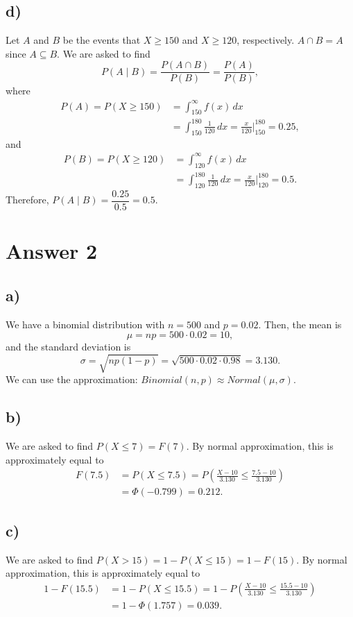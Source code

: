 \documentclass[12pt]{article}
\begin{document}
\subsection*{d)}
\noindent Let $A$ and $B$ be the events that $X \geq 150$ and $X \geq 120$, respectively. $A \cap B = A$ since $A \subseteq B$. We are asked to find
\[
    P(A \mid B) = \frac{P(A \cap B)}{P(B)} = \frac{P(A)}{P(B)},
\]
where
\begin{align*}
    P(A) = P(X \geq 150)
    &= \int_{150}^{\infty} f(x) \, dx \\
    &= \int_{150}^{180} \frac{1}{120} \, dx
    = \frac{x}{120} \bigg|_{150}^{180}
    = 0.25,
\end{align*}
and
\begin{align*}
    P(B) = P(X \geq 120)
    &= \int_{120}^{\infty} f(x) \, dx \\
    &= \int_{120}^{180} \frac{1}{120} \, dx
    = \frac{x}{120} \bigg|_{120}^{180}
    = 0.5.
\end{align*}
Therefore, $P(A \mid B) = \dfrac{0.25}{0.5} = 0.5$.

\section*{Answer 2}
\subsection*{a)}
\noindent We have a binomial distribution with $n = 500$ and $p = 0.02$. Then, the mean is
\[
    \mu = n p = 500 \cdot 0.02 = 10,
\]
and the standard deviation is
\[
    \sigma = \sqrt{n p (1 - p)} = \sqrt{500 \cdot 0.02 \cdot 0.98} = 3.130.
\]
We can use the approximation: $Binomial(n, p) \approx Normal(\mu, \sigma)$.

\subsection*{b)}
\noindent We are asked to find $P(X \leq 7) = F(7)$. By normal approximation, this is approximately equal to
\begin{align*}
    F(7.5) &= P(X \leq 7.5)
    = P \left(\frac{X - 10}{3.130} \leq \frac{7.5 - 10}{3.130} \right) \\
    &= \Phi(-0.799)
    = 0.212.
\end{align*}

\subsection*{c)}
\noindent We are asked to find $P(X > 15) = 1 - P(X \leq 15) = 1 - F(15)$. By normal approximation, this is approximately equal to
\begin{align*}
    1 - F(15.5) &= 1 - P(X \leq 15.5)
    = 1 - P \left(\frac{X - 10}{3.130} \leq \frac{15.5 - 10}{3.130} \right) \\
    &= 1 - \Phi(1.757)
    = 0.039.
\end{align*}
\end{document}
